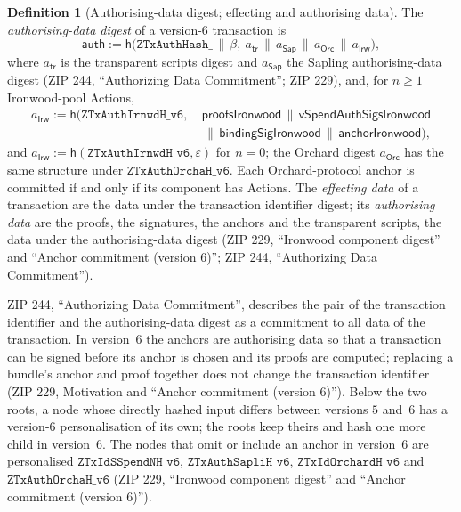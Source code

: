 \documentclass[11pt,a4paper]{article}
\theoremstyle{definition}
\newtheorem{definition}[theorem]{Definition}
\begin{document}
\begin{definition}[Authorising-data digest; effecting and authorising data]
The \emph{authorising-data digest} of a version-$6$ transaction is
\[
  \mathsf{auth} := \mathsf{h}\bigl(\texttt{ZTxAuthHash\_} \,\|\, \beta,\
    a_{\mathsf{tr}} \,\|\, a_{\mathsf{Sap}} \,\|\, a_{\mathsf{Orc}}
    \,\|\, a_{\mathsf{Irw}}\bigr),
\]
where $a_{\mathsf{tr}}$ is the transparent scripts digest and
$a_{\mathsf{Sap}}$ the Sapling authorising-data digest (ZIP 244,
``Authorizing Data Commitment''; ZIP 229), and, for $n \ge 1$
Ironwood-pool Actions,
\begin{align*}
  a_{\mathsf{Irw}} := \mathsf{h}\bigl(\texttt{ZTxAuthIrnwdH\_v6},\
    &\mathsf{proofsIronwood} \,\|\, \mathsf{vSpendAuthSigsIronwood} \\
    &\,\|\, \mathsf{bindingSigIronwood} \,\|\, \mathsf{anchorIronwood}
    \bigr),
\end{align*}
and $a_{\mathsf{Irw}} := \mathsf{h}(\texttt{ZTxAuthIrnwdH\_v6},
\varepsilon)$ for $n = 0$; the Orchard digest $a_{\mathsf{Orc}}$ has the
same structure under $\texttt{ZTxAuthOrchaH\_v6}$. Each Orchard-protocol
anchor is committed if and only if its component has Actions. The
\emph{effecting data} of a transaction are the data under the transaction
identifier digest; its \emph{authorising data} are the proofs, the
signatures, the anchors and the transparent scripts, the data under the
authorising-data digest (ZIP 229, ``Ironwood component digest'' and
``Anchor commitment (version 6)''; ZIP 244, ``Authorizing Data
Commitment'').
\end{definition}

ZIP 244, ``Authorizing Data Commitment'', describes the pair of the
transaction identifier and the authorising-data digest as a commitment to
all data of the transaction. In version~$6$ the anchors are authorising
data so that a transaction can be signed before its anchor is chosen and its
proofs are computed; replacing a bundle's anchor and proof together does not
change the transaction identifier (ZIP 229, Motivation and ``Anchor
commitment (version 6)''). Below the two roots, a node whose directly
hashed input differs between versions $5$ and~$6$ has a version-$6$
personalisation of its own; the roots keep theirs and hash one more child in
version~$6$. The nodes that omit or include an anchor in version~$6$ are
personalised $\texttt{ZTxIdSSpendNH\_v6}$, $\texttt{ZTxAuthSapliH\_v6}$,
$\texttt{ZTxIdOrchardH\_v6}$ and $\texttt{ZTxAuthOrchaH\_v6}$ (ZIP 229,
``Ironwood component digest'' and ``Anchor commitment (version 6)'').
\end{document}

